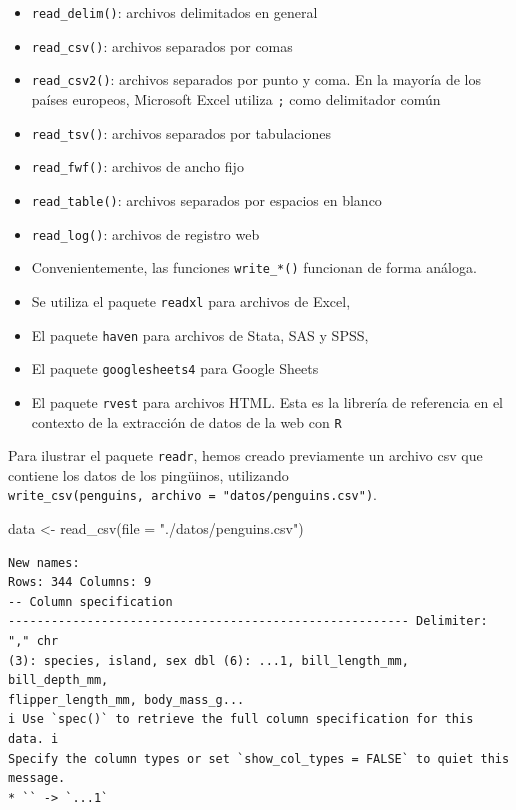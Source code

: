 \documentclass[
  letterpaper,
  DIV=11,
  numbers=noendperiod]{scrreprt}
\newenvironment{Shaded}{\begin{snugshade}}{\end{snugshade}}
\newcommand{\AttributeTok}[1]{\textcolor[rgb]{0.40,0.45,0.13}{#1}}
\newcommand{\FunctionTok}[1]{\textcolor[rgb]{0.28,0.35,0.67}{#1}}
\newcommand{\NormalTok}[1]{\textcolor[rgb]{0.00,0.23,0.31}{#1}}
\newcommand{\OtherTok}[1]{\textcolor[rgb]{0.00,0.23,0.31}{#1}}
\newcommand{\StringTok}[1]{\textcolor[rgb]{0.13,0.47,0.30}{#1}}
\begin{document}
\begin{itemize}
\item
  \texttt{read\_delim()}: archivos delimitados en general
\item
  \texttt{read\_csv()}: archivos separados por comas
\item
  \texttt{read\_csv2()}: archivos separados por punto y coma. En la
  mayoría de los países europeos, Microsoft Excel utiliza \texttt{;}
  como delimitador común
\item
  \texttt{read\_tsv()}: archivos separados por tabulaciones
\item
  \texttt{read\_fwf()}: archivos de ancho fijo
\item
  \texttt{read\_table()}: archivos separados por espacios en blanco
\item
  \texttt{read\_log()}: archivos de registro web
\item
  Convenientemente, las funciones \texttt{write\_*()} funcionan de forma
  análoga.
\item
  Se utiliza el paquete \texttt{readxl} para archivos de Excel,
\item
  El paquete \texttt{haven} para archivos de Stata, SAS y SPSS,
\item
  El paquete \texttt{googlesheets4} para Google Sheets
\item
  El paquete \texttt{rvest} para archivos HTML. Esta es la librería de
  referencia en el contexto de la extracción de datos de la web con
  \texttt{R}
\end{itemize}

Para ilustrar el paquete \texttt{readr}, hemos creado previamente un
archivo csv que contiene los datos de los pingüinos, utilizando
\texttt{write\_csv(penguins,\ archivo\ =\ "datos/penguins.csv")}.

\begin{Shaded}
\begin{Highlighting}[]
\NormalTok{data }\OtherTok{\textless{}{-}} \FunctionTok{read\_csv}\NormalTok{(}\AttributeTok{file =} \StringTok{"./datos/penguins.csv"}\NormalTok{)}
\end{Highlighting}
\end{Shaded}

\begin{verbatim}
New names:
Rows: 344 Columns: 9
-- Column specification
-------------------------------------------------------- Delimiter: "," chr
(3): species, island, sex dbl (6): ...1, bill_length_mm, bill_depth_mm,
flipper_length_mm, body_mass_g...
i Use `spec()` to retrieve the full column specification for this data. i
Specify the column types or set `show_col_types = FALSE` to quiet this message.
* `` -> `...1`
\end{verbatim}
\end{document}
